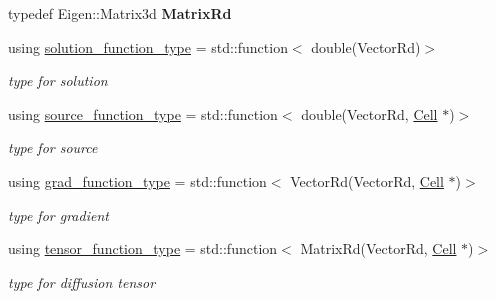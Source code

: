 \begin{DoxyCompactItemize}
\item 
\mbox{\label{classHArDCore3D_1_1HHO__LocVarDiff_ab8db576d3db326ed0ceafa73288d7786}} 
typedef Eigen\+::\+Matrix3d {\bfseries Matrix\+Rd}
\item 
\mbox{\label{classHArDCore3D_1_1HHO__LocVarDiff_a7b0e23cbc8db30ca257c47df7fd4ca25}} 
using \hyperlink{classHArDCore3D_1_1HHO__LocVarDiff_a7b0e23cbc8db30ca257c47df7fd4ca25}{solution\+\_\+function\+\_\+type} = std\+::function$<$ double(Vector\+Rd)$>$
\begin{DoxyCompactList}\small\item\em type for solution \end{DoxyCompactList}\item 
\mbox{\label{classHArDCore3D_1_1HHO__LocVarDiff_ab56032fb1c52e4a24e75af0002d0a2d4}} 
using \hyperlink{classHArDCore3D_1_1HHO__LocVarDiff_ab56032fb1c52e4a24e75af0002d0a2d4}{source\+\_\+function\+\_\+type} = std\+::function$<$ double(Vector\+Rd, \hyperlink{classHArDCore3D_1_1Cell}{Cell} $\ast$)$>$
\begin{DoxyCompactList}\small\item\em type for source \end{DoxyCompactList}\item 
\mbox{\label{classHArDCore3D_1_1HHO__LocVarDiff_aac4d74b1420ac542bcc2b96c11ccba55}} 
using \hyperlink{classHArDCore3D_1_1HHO__LocVarDiff_aac4d74b1420ac542bcc2b96c11ccba55}{grad\+\_\+function\+\_\+type} = std\+::function$<$ Vector\+Rd(Vector\+Rd, \hyperlink{classHArDCore3D_1_1Cell}{Cell} $\ast$)$>$
\begin{DoxyCompactList}\small\item\em type for gradient \end{DoxyCompactList}\item 
\mbox{\label{classHArDCore3D_1_1HHO__LocVarDiff_a70a4ae64b7a421bf535c669f340b2641}} 
using \hyperlink{classHArDCore3D_1_1HHO__LocVarDiff_a70a4ae64b7a421bf535c669f340b2641}{tensor\+\_\+function\+\_\+type} = std\+::function$<$ Matrix\+Rd(Vector\+Rd, \hyperlink{classHArDCore3D_1_1Cell}{Cell} $\ast$)$>$
\begin{DoxyCompactList}\small\item\em type for diffusion tensor \end{DoxyCompactList}\end{DoxyCompactItemize}

